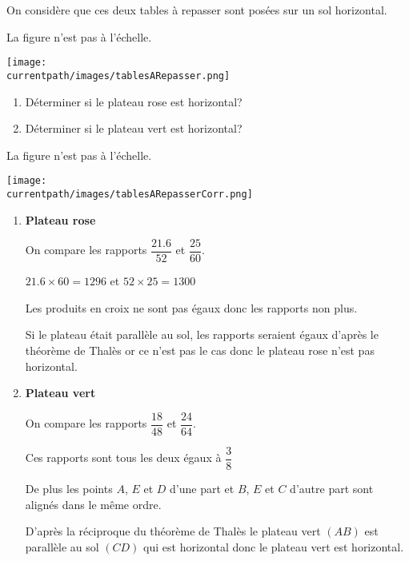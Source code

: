 \begin{exercice*}
    On considère que ces deux tables à repasser sont posées sur un sol horizontal.

    \begin{minipage}{1\linewidth}
    \begin{center}
        La figure n'est pas à l'échelle.

        \texttt{[image: \\currentpath/images/tablesARepasser.png]}    
    \end{center}
    \end{minipage}    

    \begin{enumerate}
        \item Déterminer si le plateau rose est horizontal?
        \item Déterminer si le plateau vert est horizontal?
    \end{enumerate}
\end{exercice*}
\begin{corrige}
    \phantom{rrr}

    \begin{center}
        La figure n'est pas à l'échelle.

        \texttt{[image: \\currentpath/images/tablesARepasserCorr.png]}    
    \end{center}

    \begin{enumerate}
        \item \textbf{Plateau rose}
        
        On compare les rapports $\dfrac{\num{21.6}}{52}$ et $\dfrac{25}{60}$.

        \medskip
        $\num{21.6}\times 60 = \num{1296}$ et $52\times 25 = \num{1300}$

        Les produits en croix ne sont pas égaux donc les rapports non plus.

        Si le plateau était parallèle au sol, les rapports seraient égaux d'après le 
        théorème de Thalès or ce n'est pas le cas donc le plateau rose n'est pas horizontal.
        \item \textbf{Plateau vert}

        On compare les rapports $\dfrac{18}{48}$ et $\dfrac{24}{64}$.

        \medskip
        Ces rapports sont tous les deux égaux à $\dfrac{3}{8}$

        De plus les points $A$, $E$ et $D$ d'une part et $B$, $E$ et $C$ d'autre part sont alignés dans le même ordre.

        D'après la réciproque du théorème de Thalès le plateau vert $(AB)$ est parallèle au sol $(CD)$ qui est horizontal donc le plateau vert est horizontal.

    \end{enumerate}
\end{corrige}



